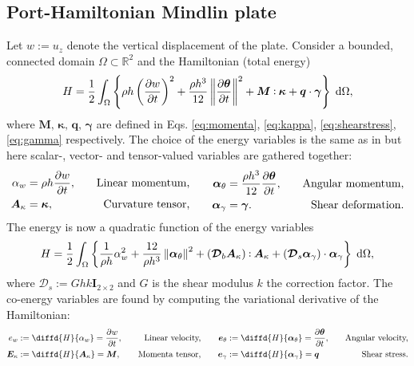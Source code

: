 \subsection{Port-Hamiltonian Mindlin plate}\label{sec:pHmin}
Let $w:= u_z$ denote the vertical displacement of the plate. Consider a bounded, connected domain $\Omega \subset \mathbb{R}^2$ and the Hamiltonian (total energy)
	\begin{equation}
	\label{eq:H_min}
	H = \frac{1}{2} \int_{\Omega}  \left\{ \rho h \left(\diffp{w}{t} \right)^2 + \frac{\rho h^3}{12} \norm{\diffp{\bm{\theta}}{t}}^2 +   \bm{M} \cddot \bm{\kappa} + \bm{q} \cdot \bm{\gamma}  \right\}  \d\Omega, 
	\end{equation}
	where $\bm{M},\, \bm{\kappa},\, \bm{q}, \, \bm{\gamma}$ are defined in Eqs. \eqref{eq:momenta}, \eqref{eq:kappa}, \eqref{eq:shearstress}, \eqref{eq:gamma} respectively. 
	The choice of the energy variables is the same as in \cite{macchelli2005mindlin} but here scalar-,  vector- and tensor-valued variables are gathered together:
\begin{equation}
\begin{aligned}
\alpha_w &= \rho h \diffp{w}{t}, \quad &\text{Linear momentum,} \\
\bm{A}_{\kappa} &= \bm{\kappa}, \quad &\text{Curvature tensor,} \\
\end{aligned} \qquad
\begin{aligned}
\bm\alpha_{\theta} &=  \frac{\rho h^3}{12} \diffp{\bm{\theta}}{t}, \quad &\text{Angular momentum,}\\
\bm\alpha_{\gamma} &= \bm{\gamma}. \quad &\text{Shear deformation.}\\
\end{aligned}
\end{equation}
The energy is now a quadratic function of the energy variables
\begin{equation}
\label{eq:Halpha_min}
H = \frac{1}{2} \int_{\Omega}  \left\{ \frac{1}{\rho h}\alpha_w^2 + \frac{12}{\rho h^3} \norm{\bm{\alpha}_{\theta}}^2 + (\bm{\mathcal{D}}_b \bm{A}_\kappa) \cddot \bm{A}_\kappa + (\bm{\mathcal{D}}_s \bm{\alpha}_\gamma) \cdot  \bm{\alpha}_\gamma  \right\}  \d\Omega, 
\end{equation}
where $\bm{\mathcal{D}}_s:= Ghk \bm{I}_{2\times 2}$ and $G$ is the shear modulus $k$ the correction factor. The co-energy variables are found by computing the variational derivative of the Hamiltonian:
\begin{equation}
\begin{aligned}
e_w &:= \diffd{H}{\alpha_w} = \diffp{w}{t},  \quad &\text{Linear velocity,} \\
\bm{E}_{\kappa} &:= \diffd{H}{\bm{A}_{\kappa}} = \bm{M}, \quad &\text{Momenta tensor,}\\
\end{aligned} \qquad
\begin{aligned}
\bm{e}_{\theta} &:= \diffd{H}{\bm\alpha_{\theta}} = \diffp{\bm{\theta}}{t}, \quad &\text{Angular velocity,}  \\
\bm{e}_{\gamma} &:= \diffd{H}{\bm\alpha_{\gamma}} = \bm{q} \quad &\text{Shear stress.} \\
\end{aligned}
\end{equation}
